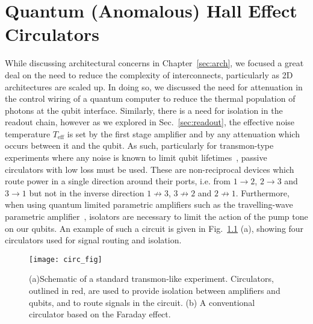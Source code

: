 \chapter{Quantum (Anomalous) Hall Effect Circulators}
\label{sec:hall}

While discussing architectural concerns in Chapter~\ref{sec:arch}, we focused a great deal on the need to reduce the complexity of interconnects,
particularly as 2D architectures are scaled up. In doing so, we discussed the need for attenuation in the control wiring of a quantum computer
to reduce the thermal population of photons at the qubit interface. Similarly, there is a need for isolation in the readout chain, however
as we explored in Sec.~\ref{sec:readout}, the effective noise temperature $T_\textrm{eff}$ is set by the first stage amplifier and by any attenuation
which occurs between it and the qubit. As such, particularly for transmon-type experiments where any noise is known to limit qubit
lifetimes~\cite{PhysRevLett.101.080502}, passive circulators with low loss must be used. These are non-reciprocal devices which route power
in a single direction around their ports, i.e. from $1 \to 2$, $2 \to 3$ and $3 \to 1$ but not in the inverse direction $1 \not\to 3$, $3 \not\to 2$
and $2 \not\to 1$. Furthermore, when using quantum limited parametric amplifiers such as the travelling-wave parametric amplifier~\cite{PhysRevLett.113.157001},
isolators are necessary to limit the action of the pump tone on our qubits. An example of such a circuit is given in Fig.~\ref{fig:circfig} (a), showing
four circulators used for signal routing and isolation.

\begin{figure}
    \texttt{[image: circ\_fig]}
    \caption[Schematic of a standard transmon-like experiment]
    {\label{fig:circfig}(a)Schematic of a standard transmon-like experiment. Circulators, outlined in red, are used to provide isolation between amplifiers and qubits,
    and to route signals in the circuit. (b) A conventional circulator based on the Faraday effect.}
\end{figure}

